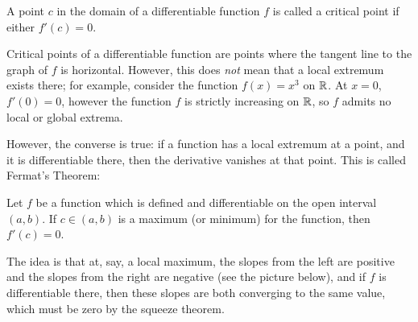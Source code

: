 \documentclass[../calculus.tex]{subfiles}
\begin{document}
\begin{definition}
    \begin{shaded*}
        A point $c$ in the domain of a differentiable function $f$ is called a critical point if either $f'(c) = 0$.
    \end{shaded*}
\end{definition}
Critical points of a differentiable function are points where the tangent line to the graph of $f$ is horizontal. However, this does \textit{not} mean that a local extremum exists there; for example, consider the function $f(x)=x^3$ on $\mathbb{R}$. At $x=0$, $f'(0)=0$, however the function $f$ is strictly increasing on $\mathbb{R}$, so $f$ admits no local or global extrema.

However, the converse is true: if a function has a local extremum at a point, and it is differentiable there, then the derivative vanishes at that point. This is called Fermat's Theorem:

\begin{theorem}
    \begin{shaded*}
        Let $f$ be a function which is defined and differentiable on the open interval $(a,b)$. If $c \in (a,b)$ is a maximum (or minimum) for the function, then $f'(c) = 0$.
    \end{shaded*}
\end{theorem}
The idea is that at, say, a local maximum, the slopes from the left are positive and the slopes from the right are negative (see the picture below), and if $f$ is differentiable there, then these slopes are both converging to the same value, which must be zero by the squeeze theorem.

\begin{center}
\end{center}
\end{document}
